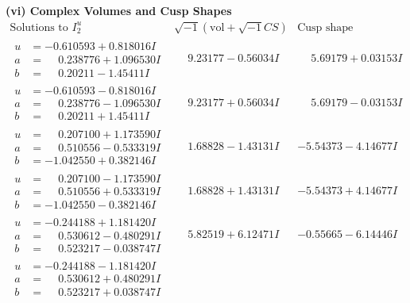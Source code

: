 \documentclass[1p]{elsarticle_modified}
\theoremstyle{definition}
\newcommand{\I}{\sqrt{-1}}
\begin{document}
\newpage\flushleft \textbf{(vi) Complex Volumes and Cusp Shapes}
$$\begin{array}{c|c|c}  
\text{Solutions to }I^u_{2}& \I (\text{vol} + \sqrt{-1}CS) & \text{Cusp shape}\\
 \hline 
\begin{aligned}
u &= -0.610593 + 0.818016 I \\
a &= \phantom{-}0.238776 + 1.096530 I \\
b &= \phantom{-}0.20211 - 1.45411 I\end{aligned}
 & \phantom{-}9.23177 - 0.56034 I & \phantom{-}5.69179 + 0.03153 I \\ \hline\begin{aligned}
u &= -0.610593 - 0.818016 I \\
a &= \phantom{-}0.238776 - 1.096530 I \\
b &= \phantom{-}0.20211 + 1.45411 I\end{aligned}
 & \phantom{-}9.23177 + 0.56034 I & \phantom{-}5.69179 - 0.03153 I \\ \hline\begin{aligned}
u &= \phantom{-}0.207100 + 1.173590 I \\
a &= \phantom{-}0.510556 - 0.533319 I \\
b &= -1.042550 + 0.382146 I\end{aligned}
 & \phantom{-}1.68828 - 1.43131 I & -5.54373 - 4.14677 I \\ \hline\begin{aligned}
u &= \phantom{-}0.207100 - 1.173590 I \\
a &= \phantom{-}0.510556 + 0.533319 I \\
b &= -1.042550 - 0.382146 I\end{aligned}
 & \phantom{-}1.68828 + 1.43131 I & -5.54373 + 4.14677 I \\ \hline\begin{aligned}
u &= -0.244188 + 1.181420 I \\
a &= \phantom{-}0.530612 - 0.480291 I \\
b &= \phantom{-}0.523217 - 0.038747 I\end{aligned}
 & \phantom{-}5.82519 + 6.12471 I & -0.55665 - 6.14446 I \\ \hline\begin{aligned}
u &= -0.244188 - 1.181420 I \\
a &= \phantom{-}0.530612 + 0.480291 I \\
b &= \phantom{-}0.523217 + 0.038747 I\end{aligned}

\end{array}$$
\end{document}
